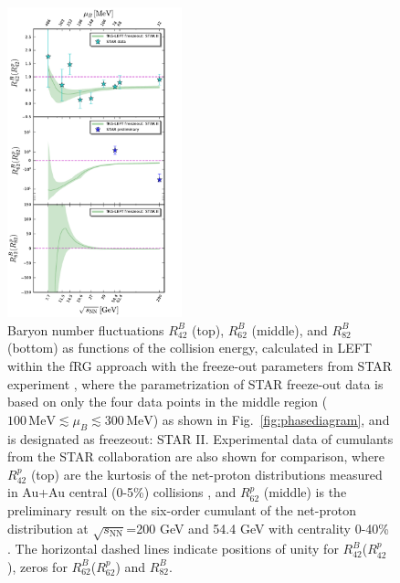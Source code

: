 \documentclass[%
reprint,
superscriptaddress,
showpacs,preprintnumbers,
amsmath,amssymb,
aps,
prd,
]{revtex4-1}
\def\Fig#1{Fig.~\ref{#1}} \def\Tab#1{Tab.~\ref{#1}}
\begin{document}
	\begin{figure}[t]
		\includegraphics[width=0.45\textwidth]{Rm2-sqrtS2}
		\caption{Baryon number fluctuations $R^{B}_{42}$ (top), $R^{B}_{62}$ (middle), and $R^{B}_{82}$ (bottom) as functions of the collision energy, calculated in LEFT within the fRG approach with the freeze-out parameters from STAR experiment \cite{Adamczyk:2017iwn}, where the parametrization of STAR freeze-out data is based on only the four data points in the middle region ($100\,\mathrm{MeV}\lesssim\mu_B\lesssim 300\,\mathrm{MeV}$) as shown in \Fig{fig:phasediagram}, and is designated as freezeout: STAR II. Experimental data of cumulants from the STAR collaboration are also shown for comparison, where $R^{p}_{42}$ (top) are the kurtosis of the net-proton distributions measured in Au+Au central (0-5\%) collisions \cite{Adam:2020unf}, and $R^{p}_{62}$ (middle) is the preliminary result on the six-order cumulant of the net-proton distribution at $\sqrt{s_{\mathrm{NN}}}$=200 GeV and 54.4 GeV with centrality 0-40\% \cite{Nonaka:2020crv,Pandav:2020uzx}. The horizontal dashed lines indicate positions of unity for $R^{B}_{42}$($R^{p}_{42}$), zeros for $R^{B}_{62}$($R^{p}_{62}$) and $R^{B}_{82}$.}\label{fig:Rm2-sqrtS2}\vspace{-0.5cm}
	\end{figure}
	
\end{document}
